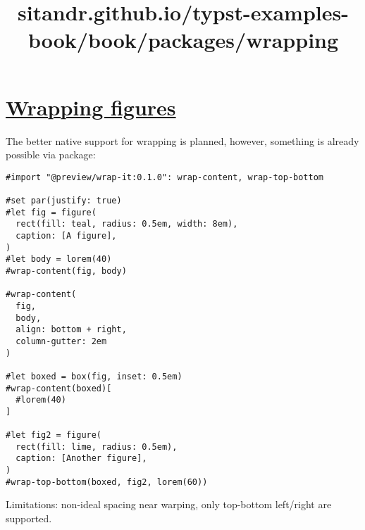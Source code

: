 \title{sitandr.github.io/typst-examples-book/book/packages/wrapping}

\section{\texorpdfstring{\hyperref[wrapping-figures]{Wrapping
figures}}{Wrapping figures}}\label{wrapping-figures}

The better native support for wrapping is planned, however, something is
already possible via package:

\begin{verbatim}
#import "@preview/wrap-it:0.1.0": wrap-content, wrap-top-bottom

#set par(justify: true)
#let fig = figure(
  rect(fill: teal, radius: 0.5em, width: 8em),
  caption: [A figure],
)
#let body = lorem(40)
#wrap-content(fig, body)

#wrap-content(
  fig,
  body,
  align: bottom + right,
  column-gutter: 2em
)

#let boxed = box(fig, inset: 0.5em)
#wrap-content(boxed)[
  #lorem(40)
]

#let fig2 = figure(
  rect(fill: lime, radius: 0.5em),
  caption: [Another figure],
)
#wrap-top-bottom(boxed, fig2, lorem(60))
\end{verbatim}

\pandocbounded{}

Limitations: non-ideal spacing near warping, only top-bottom left/right
are supported.
